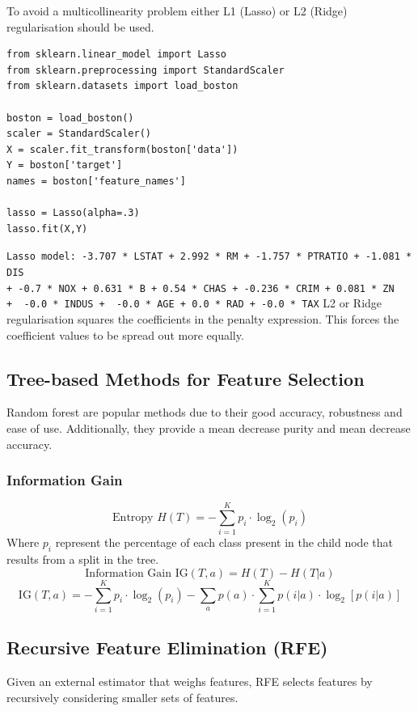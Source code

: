 \documentclass[11pt]{article}
\theoremstyle{definition}
\begin{document}
To avoid a multicollinearity problem either L1 (Lasso) or L2 (Ridge) regularisation should be used.

\begin{verbatim}
from sklearn.linear_model import Lasso
from sklearn.preprocessing import StandardScaler
from sklearn.datasets import load_boston

boston = load_boston()
scaler = StandardScaler()
X = scaler.fit_transform(boston['data'])
Y = boston['target']
names = boston['feature_names']

lasso = Lasso(alpha=.3)
lasso.fit(X,Y)
\end{verbatim}
\texttt{Lasso model: -3.707 * LSTAT + 2.992 * RM + -1.757 * PTRATIO + -1.081 * DIS\\
	+ -0.7 * NOX + 0.631 * B + 0.54 * CHAS + -0.236 * CRIM + 0.081 * ZN\\
	+ {\color{red} -0.0 * INDUS} + {\color{red} -0.0 * AGE} + {\color{red}0.0 * RAD} + {\color{red}-0.0 * TAX}}
L2 or Ridge regularisation squares the coefficients in the penalty expression. This forces the coefficient values to be spread out more equally.

\subsection{Tree-based Methods for Feature Selection}
Random forest are popular methods due to their good accuracy, robustness and ease of use. Additionally, they provide a mean decrease purity and mean decrease accuracy.

\subsubsection{Information Gain}
\begin{equation*}
	\text{Entropy }H(T) = -\sum_{i=1}^{K} p_i\cdot\log_2(p_i)
\end{equation*}
Where $p_i$ represent the percentage of each class present in the child node that results from a split in the tree.
\begin{equation*}
	\text{Information Gain } \text{IG}(T,a) = H(T) - H(T|a)
\end{equation*}
\begin{equation*}
	\text{IG}(T,a) = -\sum_{i=1}^{K} p_i\cdot\log_2(p_i) - \sum_a p(a)\cdot\sum_{i=1}^{K} p(i|a)\cdot\log_2[p(i|a)]
\end{equation*}

\subsection{Recursive Feature Elimination (RFE)}
Given an external estimator that weighs features, RFE selects features by recursively considering smaller sets of features.
\end{document}
